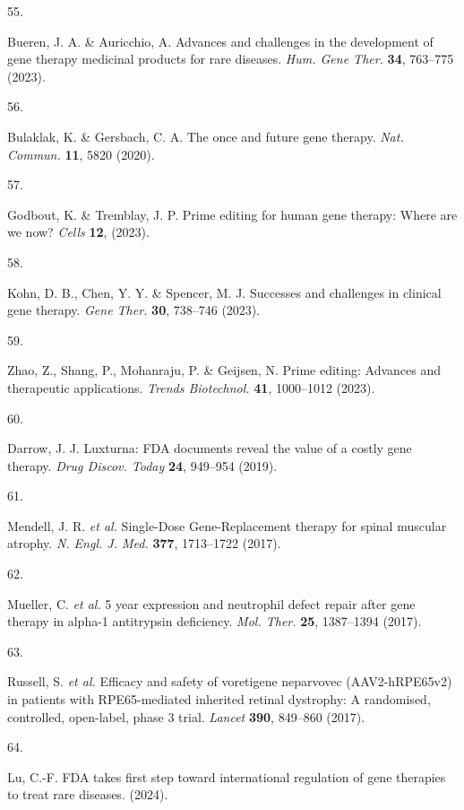 \documentclass[
sn-nature
]{sn-jnl}
\newlength{\cslhangindent}
\newlength{\csllabelwidth}
\newenvironment{CSLReferences}[2] %
 {\begin{list}{}{%
  \setlength{\itemindent}{0pt}
  \setlength{\leftmargin}{0pt}
  \setlength{\parsep}{0pt}
  \ifodd #1
   \setlength{\leftmargin}{\cslhangindent}
   \setlength{\itemindent}{-1\cslhangindent}
  \fi
  \setlength{\itemsep}{#2\baselineskip}}}
 {\end{list}}
\newcommand{\CSLLeftMargin}[1]{\parbox[t]{\csllabelwidth}{\strut#1\strut}}
\newcommand{\CSLRightInline}[1]{\parbox[t]{\linewidth - \csllabelwidth}{\strut#1\strut}}
\begin{document}
\begin{CSLReferences}{0}{0}
\CSLLeftMargin{55. }%
\CSLRightInline{Bueren, J. A. \& Auricchio, A. Advances and challenges
in the development of gene therapy medicinal products for rare diseases.
\emph{Hum. Gene Ther.} \textbf{34}, 763--775 (2023).}

\CSLLeftMargin{56. }%
\CSLRightInline{Bulaklak, K. \& Gersbach, C. A. The once and future gene
therapy. \emph{Nat. Commun.} \textbf{11}, 5820 (2020).}

\CSLLeftMargin{57. }%
\CSLRightInline{Godbout, K. \& Tremblay, J. P. Prime editing for human
gene therapy: Where are we now? \emph{Cells} \textbf{12}, (2023).}

\CSLLeftMargin{58. }%
\CSLRightInline{Kohn, D. B., Chen, Y. Y. \& Spencer, M. J. Successes and
challenges in clinical gene therapy. \emph{Gene Ther.} \textbf{30},
738--746 (2023).}

\CSLLeftMargin{59. }%
\CSLRightInline{Zhao, Z., Shang, P., Mohanraju, P. \& Geijsen, N. Prime
editing: Advances and therapeutic applications. \emph{Trends
Biotechnol.} \textbf{41}, 1000--1012 (2023).}

\CSLLeftMargin{60. }%
\CSLRightInline{Darrow, J. J. Luxturna: {FDA} documents reveal the value
of a costly gene therapy. \emph{Drug Discov. Today} \textbf{24},
949--954 (2019).}

\CSLLeftMargin{61. }%
\CSLRightInline{Mendell, J. R. \emph{et al.} {Single-Dose}
{Gene-Replacement} therapy for spinal muscular atrophy. \emph{N. Engl.
J. Med.} \textbf{377}, 1713--1722 (2017).}

\CSLLeftMargin{62. }%
\CSLRightInline{Mueller, C. \emph{et al.} 5 year expression and
neutrophil defect repair after gene therapy in alpha-1 antitrypsin
deficiency. \emph{Mol. Ther.} \textbf{25}, 1387--1394 (2017).}

\CSLLeftMargin{63. }%
\CSLRightInline{Russell, S. \emph{et al.} Efficacy and safety of
voretigene neparvovec ({AAV2-hRPE65v2}) in patients with
{RPE65-mediated} inherited retinal dystrophy: A randomised, controlled,
open-label, phase 3 trial. \emph{Lancet} \textbf{390}, 849--860 (2017).}

\CSLLeftMargin{64. }%
\CSLRightInline{Lu, C.-F. {FDA} takes first step toward international
regulation of gene therapies to treat rare diseases. (2024).}


\end{CSLReferences}
\end{document}
